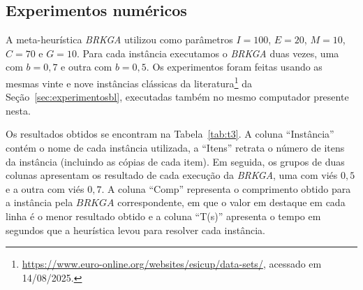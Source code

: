 \subsection{Experimentos numéricos} \label{sec:experimentosBRKGA}

A meta-heurística \textit{BRKGA} utilizou como parâmetros $I = 100$, $E = 20$, $M = 10$, $C = 70$ e $G = 10$. Para cada instância executamos o \textit{BRKGA} duas vezes, uma com $b = 0,7$ e outra com $b = 0,5$. 
Os experimentos foram feitas usando as mesmas vinte e nove instâncias clássicas da literatura\footnote{\url{https://www.euro-online.org/websites/esicup/data-sets/}, acessado em 14/08/2025.} da Seção~\ref{sec:experimentosbl}, executadas também no mesmo computador presente nesta.

Os resultados obtidos se encontram na Tabela~\ref{tab:t3}. 
A coluna ``Instância'' contém o nome de cada instância utilizada, a ``Itens'' retrata o número de itens da instância (incluindo as cópias de cada item). 
Em seguida, os grupos de duas colunas apresentam os resultado de cada execução da \textit{BRKGA}, uma com viés $0,5$ e a outra com viés $0,7$. 
A coluna ``Comp'' representa o comprimento obtido para a instância pela $BRKGA$ correspondente, em que o valor em destaque em cada linha é o menor resultado obtido e a coluna ``T(s)'' apresenta o tempo em segundos que a heurística levou para resolver cada instância.


